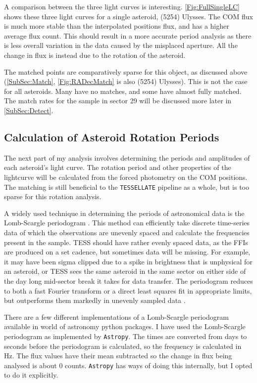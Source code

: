 \documentclass{UCreport}
\begin{document}
A comparison between the three light curves is interesting.
\autoref{Fig:FullSingleLC} shows these three light curves for a single asteroid, (5254) Ulysses.
The COM flux is much more stable than the interpolated positions flux, and has a higher average flux count.
This should result in a more accurate period analysis as there is less overall variation in the data caused by the misplaced aperture.
All the change in flux is instead due to the rotation of the asteroid.

The matched points are comparatively sparse for this object, as discussed above (\autoref{SubSec:Match}, \autoref{Fig:RADecMatch} is also (5254) Ulysses).
This is not the case for all asteroids.
Many have no matches, and some have almost fully matched.
The match rates for the sample in sector 29 will be discussed more later in \autoref{SubSec:Detect}.

\subsection{Calculation of Asteroid Rotation Periods}\label{SubSec:Periods}

The next part of my analysis involves determining the periods and amplitudes of each asteroid's light curve.
The rotation period and other properties of the lightcurve will be calculated from the forced photometry on the COM positions. 
The matching is still beneficial to the \texttt{TESSELLATE} pipeline as a whole, but is too sparse for this rotation analysis.

A widely used technique in determining the periods of astronomical data is the Lomb-Scargle periodogram \citep[\citet{Lomb1976,Scargle1982}, but see][for a review]{VanderPlas2018}.
This method can efficiently take discrete time-series data of which the observations are unevenly spaced and calculate the frequencies present in the sample.
TESS should have rather evenly spaced data, as the FFIs are produced on a set cadence, but sometimes data will be missing.
For example, it may have been sigma clipped due to a spike in brightness that is unphysical for an asteroid, or TESS sees the same asteroid in the same sector on either side of the day long mid-sector break it takes for data transfer.
The periodogram reduces to both a fast Fourier transform or a direct least squares fit in appropriate limits, but outperforms them markedly in unevenly sampled data \citep{VanderPlas2018}.

There are a few different implementations of a Lomb-Scargle periodogram available in world of astronomy python packages.
I have used the Lomb-Scargle periodogram as implemented by \texttt{Astropy}\citep[\citet{Astropy2022} but see][for the implementation]{Vanderplas2012,Vanderplas2015}.
The times are converted from days to seconds before the periodogram is calculated, so the frequency is calculated in \unit{\hertz}.
The flux values have their mean subtracted so the change in flux being analysed is about 0 counts.
\texttt{Astropy} has ways of doing this internally, but I opted to do it explicitly.
\end{document}
